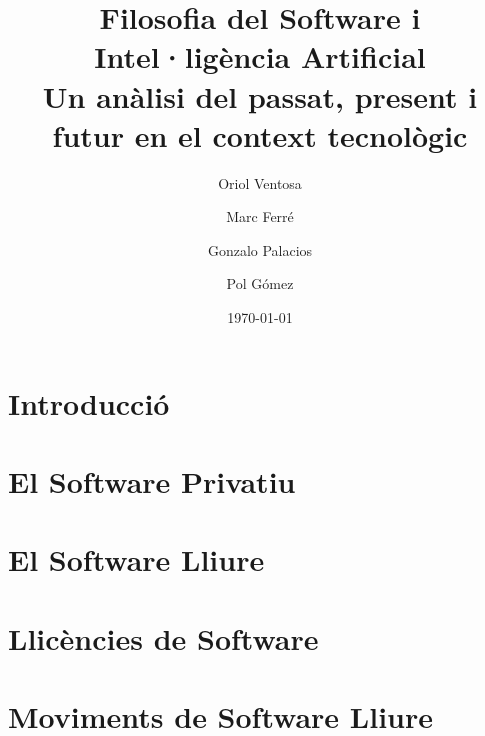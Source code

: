 \documentclass[a4paper,12pt]{report}
\begin{document}
\title{
	{\bf Filosofia del Software i Intel·ligència Artificial} \\ \vspace{2 mm}
	{\large Un anàlisi del passat, present i futur en el context tecnològic}
}
\author{
	Oriol Ventosa \and
	Marc Ferré \and
	Gonzalo Palacios \and
	Pol Gómez
}
\date{\today}
\maketitle

\tableofcontents

\chapter{Introducció}


\chapter{El Software Privatiu}


\chapter{El Software Lliure}


\chapter{Llicències de Software}


\chapter{Moviments de Software Lliure}

\end{document}
